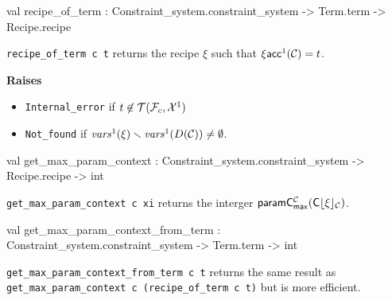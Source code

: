 \begin{ocamldocsigend}
\begin{ocamldocdescription}
\end{ocamldocdescription}


\label{val:Constraint-underscoresystem.Phase-underscore2.recipe-underscoreof-underscoreterm}\begin{ocamldoccode}
val recipe_of_term :
  Constraint_system.constraint_system -> Term.term -> Recipe.recipe
\end{ocamldoccode}
\begin{ocamldocdescription}
{\tt{recipe\_of\_term c t}} returns the recipe $\xi$ such that $\xi\mathsf{acc}^1(\mathcal{C}) = t$. 

{\bf Raises} \begin{itemize}
\item {\tt{Internal\_error}} if $t \not\in \mathcal{T}(\mathcal{F}_c, \mathcal{X}^1)$ 
\item {\tt{Not\_found}} if $\mathit{vars}^1(\xi) \smallsetminus \mathit{vars}^1(D(\mathcal{C})) \neq \emptyset$. 
\end{itemize}



\end{ocamldocdescription}


\label{val:Constraint-underscoresystem.Phase-underscore2.get-underscoremax-underscoreparam-underscorecontext}\begin{ocamldoccode}
val get_max_param_context :
  Constraint_system.constraint_system -> Recipe.recipe -> int
\end{ocamldoccode}
\begin{ocamldocdescription}
{\tt{get\_max\_param\_context c xi}} returns the interger $\mathsf{paramC^{\mathcal{C}}_{max}}({\mathsf{C}\lfloor\xi\rfloor_{\mathcal{C}}})$. 


\end{ocamldocdescription}


\label{val:Constraint-underscoresystem.Phase-underscore2.get-underscoremax-underscoreparam-underscorecontext-underscorefrom-underscoreterm}\begin{ocamldoccode}
val get_max_param_context_from_term :
  Constraint_system.constraint_system -> Term.term -> int
\end{ocamldoccode}
\begin{ocamldocdescription}
{\tt{get\_max\_param\_context\_from\_term c t}} returns the same result as
      {\tt{get\_max\_param\_context c (recipe\_of\_term c t)}} but is more efficient.



\end{ocamldocdescription}
\end{ocamldocsigend}
